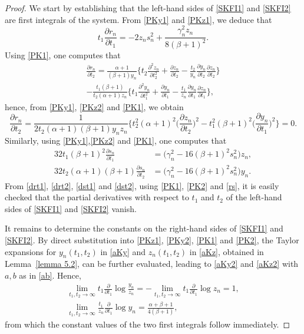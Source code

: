 \documentclass[10pt, reqno]{amsart}
\numberwithin{equation}{section}
\numberwithin{equation}{section}
\begin{document}
\begin{proof}
We start by establishing that the left-hand sides of \eqref{SKFI1} and \eqref{SKFI2} are first integrals of the system. From \eqref{PKy1} and \eqref{PKz1}, we deduce that
\begin{equation}
t_1\frac{\partial r_n}{\partial t_1}=-2z_ns_n^2+\frac{\gamma_n^2 z_n}{8(\beta+1)^2}.\label{drt1}
\end{equation}
Using \eqref{PK1}, one computes that
\begin{multline*}
\frac{\partial r_n}{\partial t_2}=\frac{\alpha+1}{(\beta+1)y_n}\Big\{t_2\frac{\partial^2z_n}{\partial t_2^2}+\frac{\partial z_n}{\partial t_2}-\frac{t_2}{y_n}\frac{\partial y_n}{\partial t_2}\frac{\partial z_n}{\partial t_2}\Big\}\\
-\frac{t_1(\beta+1)}{t_2(\alpha+1)z_n}\Big\{t_1\frac{\partial^2 y_n}{\partial t_1^2}+\frac{\partial y_n}{\partial t_1}-\frac{t_1}{z_n}\frac{\partial y_n}{\partial t_1}\frac{\partial z_n}{\partial t_1}\Big\},
\end{multline*} 
hence, from \eqref{PKy1}, \eqref{PKz2} and \eqref{PK1}, we obtain
\begin{equation}
\frac{\partial r_n}{\partial t_2}=\frac{1}{2t_2(\alpha+1)(\beta+1)y_nz_n}\Big\{t_2^2(\alpha+1)^2\Big(\frac{\partial z_n}{\partial t_2}\Big)^2-t_1^2(\beta+1)^2\Big(\frac{\partial y_n}{\partial t_1}\Big)^2\Big\}=0.\label{drt2}
\end{equation}
Similarly, using \eqref{PKy1},\eqref{PKz2} and \eqref{PK1}, one computes that 
\begin{align}
32t_1(\beta+1)^2\frac{\partial s_n}{\partial t_1}&=\big(\gamma_n^2-16(\beta+1)^2s_n^2\big)z_n,\label{dst1}\\
32t_2(\alpha+1)(\beta+1)\frac{\partial s_n}{\partial t_2}&=\big(\gamma_n^2-16(\beta+1)^2s_n^2\big)y_n.\label{dst2}
\end{align}
From \eqref{drt1}, \eqref{drt2}, \eqref{dst1} and \eqref{dst2}, using \eqref{PK1}, \eqref{PK2} and \eqref{rs}, it is easily checked that the partial derivatives with respect to $t_1$ and $t_2$ of the left-hand sides of \eqref{SKFI1} and \eqref{SKFI2} vanish. 

It remains to determine the constants on the right-hand sides of \eqref{SKFI1} and \eqref{SKFI2}. By direct substitution into \eqref{PKz1}, \eqref{PKy2}, \eqref{PK1} and \eqref{PK2}, the Taylor expansions for $y_n(t_1,t_2)$ in \eqref{aKy} and $z_n(t_1,t_2)$ in \eqref{aKz}, obtained in Lemma~\ref{lemma 5.2}, can be further evaluated, leading to \eqref{aKy2} and \eqref{aKz2} with $a,b$ as in \eqref{ab}. Hence,
\begin{gather}
\lim_{t_1,t_2 \to \infty} t_1\frac{\partial}{\partial t_1}\log \frac{y_n}{z_n}=-\lim_{t_1,t_2\to \infty} t_1\frac{\partial}{\partial t_1} \log z_n=1,\label{ldy/z}\\
\lim_{t_1, t_2 \to \infty} \frac{t_1}{z_n}\frac{\partial}{\partial t_1} \log y_n=\frac{\alpha+\beta+1}{4(\beta+1)}, \label{ldyz}
\end{gather}
from which the constant values of the two first integrals follow immediately. 


\end{proof}
\end{document}
